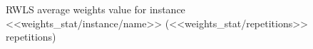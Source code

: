 \begin{figure}[H]
	\centering%
	\caption{RWLS average weights value for instance <<weights_stat/instance/name>> (<<weights_stat/repetitions>> repetitions)}%
\end{figure}
